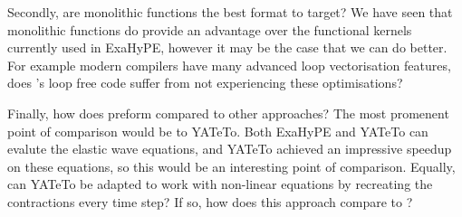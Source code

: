 Secondly, are monolithic functions the best format to target?
We have seen that monolithic functions do provide an advantage over the functional kernels currently used in ExaHyPE, however it may be the case that we can do better.
For example modern compilers have many advanced loop vectorisation features, does \phlat{}'s loop free code suffer from not experiencing these optimisations?


Finally, how does \phlat preform compared to other approaches?
The most promenent point of comparison would be to YATeTo.
Both ExaHyPE and YATeTo can evalute the elastic wave equations, and YATeTo achieved an impressive speedup on these equations, so this would be an interesting point of comparison.
Equally, can YATeTo be adapted to work with non-linear equations by recreating the contractions every time step?
If so, how does this approach compare to \phlat?

